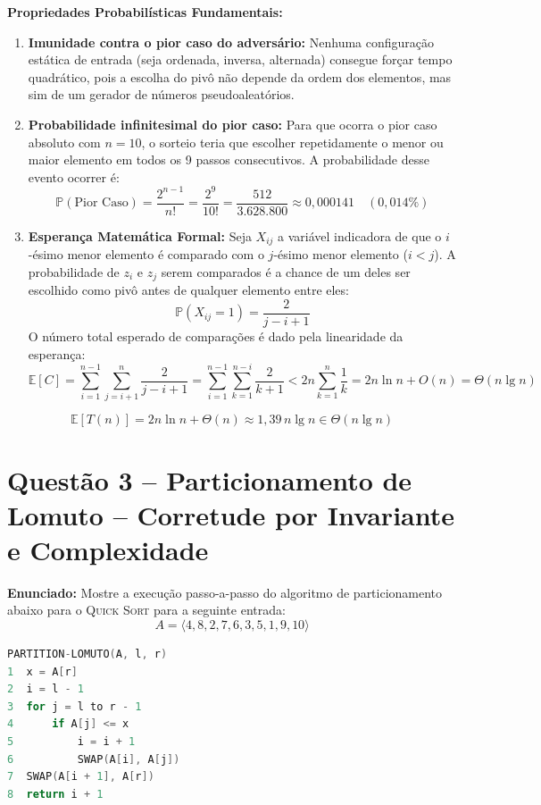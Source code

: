 \documentclass[11pt,a4paper]{article}
\newcommand{\res}[1]{\[\boxed{#1}\]}
\newcommand{\subtopico}[1]{\par\smallskip\textbf{#1}\par}
\newcommand{\questao}[2]{\section*{Questão #1 -- #2}}
\begin{document}
\subtopico{Propriedades Probabilísticas Fundamentais:}
\begin{enumerate}
  \item \textbf{Imunidade contra o pior caso do adversário:} Nenhuma configuração estática de entrada (seja ordenada, inversa, alternada) consegue forçar tempo quadrático, pois a escolha do pivô não depende da ordem dos elementos, mas sim de um gerador de números pseudoaleatórios.
  \item \textbf{Probabilidade infinitesimal do pior caso:} Para que ocorra o pior caso absoluto com $n=10$, o sorteio teria que escolher repetidamente o menor ou maior elemento em todos os 9 passos consecutivos. A probabilidade desse evento ocorrer é:
  \[
  \mathbb{P}(\text{Pior Caso}) = \frac{2^{n-1}}{n!} = \frac{2^9}{10!} = \frac{512}{3.628.800} \approx 0{,}000141 \quad (0{,}014\%)
  \]
  \item \textbf{Esperança Matemática Formal:}
  Seja $X_{ij}$ a variável indicadora de que o $i$-ésimo menor elemento é comparado com o $j$-ésimo menor elemento ($i < j$). A probabilidade de $z_i$ e $z_j$ serem comparados é a chance de um deles ser escolhido como pivô antes de qualquer elemento entre eles:
  \[
  \mathbb{P}(X_{ij} = 1) = \frac{2}{j - i + 1}
  \]
  O número total esperado de comparações é dado pela linearidade da esperança:
  \[
  \mathbb{E}[C] = \sum_{i=1}^{n-1}\sum_{j=i+1}^{n} \frac{2}{j - i + 1} = \sum_{i=1}^{n-1}\sum_{k=1}^{n-i} \frac{2}{k+1} < 2n \sum_{k=1}^{n} \frac{1}{k} = 2n \ln n + O(n) = \Theta(n \lg n)
  \]
\end{enumerate}
\res{\mathbb{E}[T(n)] = 2n \ln n + \Theta(n) \approx 1{,}39\, n \lg n \in \Theta(n \lg n)}

\newpage
\questao{3}{Particionamento de Lomuto -- Corretude por Invariante e Complexidade}

\textbf{Enunciado:} Mostre a execução passo-a-passo do algoritmo de particionamento abaixo para o \textsc{Quick Sort} para a seguinte entrada:
\[
A = \langle 4, 8, 2, 7, 6, 3, 5, 1, 9, 10 \rangle
\]

\begin{lstlisting}[language=C]
PARTITION-LOMUTO(A, l, r)
1  x = A[r]
2  i = l - 1
3  for j = l to r - 1
4      if A[j] <= x
5          i = i + 1
6          SWAP(A[i], A[j])
7  SWAP(A[i + 1], A[r])
8  return i + 1
\end{lstlisting}
\end{document}
